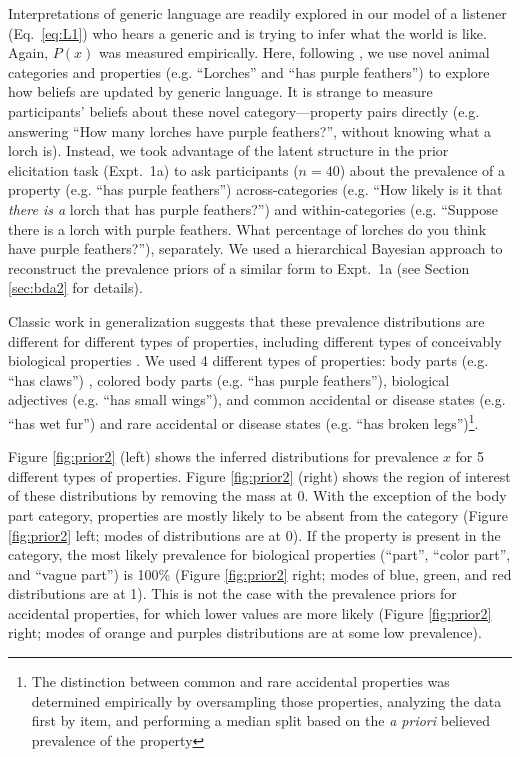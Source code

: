 \documentclass[10pt,letterpaper]{article}
\begin{document}
Interpretations of generic language are readily explored in our model of a listener (Eq.~\ref{eq:L1}) who hears a generic and is trying to infer what the world is like. 
Again, $P(x)$ was measured empirically.
Here, following , we use novel animal categories and properties (e.g. ``Lorches'' and ``has purple feathers'') to explore how beliefs are updated by generic language. 
It is strange to measure participants' beliefs about these novel category---property pairs directly (e.g. answering ``How many lorches have purple feathers?'', without knowing what a lorch is).
Instead, we took advantage of the latent structure in the prior elicitation task (Expt.~1a) to ask participants ($n=40$) about the prevalence of a property (e.g. ``has purple feathers'') across-categories (e.g. ``How likely is it that \emph{there is a} lorch that has purple feathers?'') and within-categories (e.g. ``Suppose there is a lorch with purple feathers. What percentage of lorches do you think have purple feathers?''), separately. 
We used a hierarchical Bayesian approach to reconstruct the prevalence priors of a similar form to Expt.~1a (see Section \ref{sec:bda2} for details).

Classic work in generalization suggests that these prevalence distributions are different for different types of properties, including different types of conceivably biological properties \cite{Nisbett1983}. 
We used 4 different types of properties: body parts (e.g. ``has claws'') , colored body parts (e.g. ``has purple feathers''), biological adjectives (e.g. ``has small wings''), and common accidental or disease states (e.g. ``has wet fur'') and rare accidental or disease states (e.g. ``has broken legs'')\footnote{The distinction between common and rare accidental properties was determined empirically by oversampling those properties, analyzing the data first by item, and performing a median split based on the \emph{a priori} believed prevalence of the property}.

Figure \ref{fig:prior2} (left) shows the inferred distributions for prevalence $x$ for 5 different types of properties. 
Figure \ref{fig:prior2} (right) shows the region of interest of these distributions by removing the mass at 0. 
With the exception of the body part category, properties are mostly likely to be absent from the category (Figure \ref{fig:prior2} left; modes of distributions are at 0).
If the property is present in the category, the most likely prevalence for biological properties (``part'', ``color part'', and ``vague part'') is 100\% (Figure \ref{fig:prior2} right; modes of blue, green, and red distributions are at 1).
This is not the case with the prevalence priors for accidental properties, for which lower values are more likely (Figure \ref{fig:prior2} right; modes of orange and purples distributions are at some low prevalence).
\end{document}
